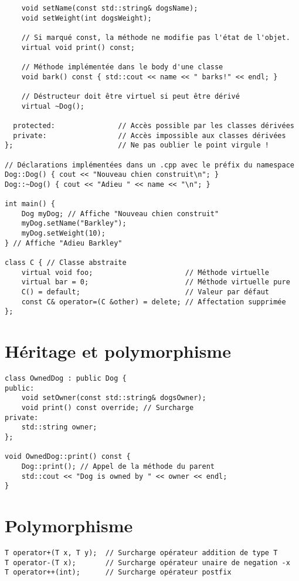 \documentclass{article}
\begin{document}
\begin{multicols*}{3}
\begin{lstlisting}
    void setName(const std::string& dogsName);
    void setWeight(int dogsWeight);

    // Si marqué const, la méthode ne modifie pas l'état de l'objet.
    virtual void print() const;

    // Méthode implémentée dans le body d'une classe
    void bark() const { std::cout << name << " barks!" << endl; }

    // Déstructeur doit être virtuel si peut être dérivé
    virtual ~Dog();

  protected:               // Accès possible par les classes dérivées
  private:                 // Accès impossible aux classes dérivées
};                         // Ne pas oublier le point virgule !

// Déclarations implémentées dans un .cpp avec le préfix du namespace
Dog::Dog() { cout << "Nouveau chien construit\n"; }
Dog::~Dog() { cout << "Adieu " << name << "\n"; }

int main() {
    Dog myDog; // Affiche "Nouveau chien construit"
    myDog.setName("Barkley");
    myDog.setWeight(10);
} // Affiche "Adieu Barkley"

class C { // Classe abstraite
    virtual void foo;                      // Méthode virtuelle
    virtual bar = 0;                       // Méthode virtuelle pure
    C() = default;                         // Valeur par défaut
    const C& operator=(C &other) = delete; // Affectation supprimée
};
\end{lstlisting}

\section*{Héritage et polymorphisme}

\begin{lstlisting}
class OwnedDog : public Dog {
public:
    void setOwner(const std::string& dogsOwner);
    void print() const override; // Surcharge
private:
    std::string owner;
};

void OwnedDog::print() const {
    Dog::print(); // Appel de la méthode du parent
    std::cout << "Dog is owned by " << owner << endl;
}
\end{lstlisting}

\section*{Polymorphisme}

\begin{lstlisting}
T operator+(T x, T y);  // Surcharge opérateur addition de type T
T operator-(T x);       // Surcharge opérateur unaire de negation -x
T operator++(int);      // Surcharge opérateur postfix


\end{lstlisting}
\end{multicols*}
\end{document}
